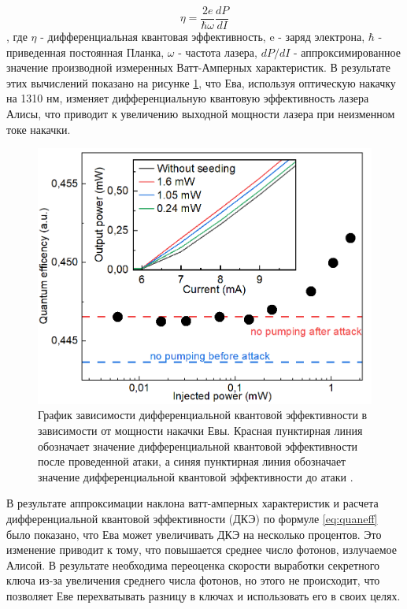 \begin{equation}
\eta = \frac{2e}{\hbar\omega}\frac{dP}{dI}
\label{eq:quaneff}
\end{equation}, 
где $\eta$ - дифференциальная квантовая эффективность, e - заряд электрона, $\hbar$ - приведенная постоянная Планка, $\omega$ - частота лазера, $dP/dI$ - аппроксимированное значение производной измеренных Ватт-Амперных характеристик.
В результате этих вычислений показано на рисунке \ref{fig:diff quant eff ch4}, что Ева, используя оптическую накачку на 1310 нм, изменяет дифференциальную квантовую эффективность лазера Алисы, что приводит к увеличению выходной мощности лазера при неизменном токе накачки.
\begin{figure}
    \centering
    \includegraphics{images/Эффективность 1310.png}
    \caption{График зависимости дифференциальной квантовой эффективности в зависимости от мощности накачки Евы. Красная пунктирная линия обозначает значение дифференциальной квантовой эффективности после проведенной атаки, а синяя пунктирная линия обозначает значение дифференциальной квантовой эффективности до атаки \cite{fadeev2025}.}
    \label{fig:diff quant eff ch4}
\end{figure}
В результате аппроксимации наклона ватт-амперных характеристик и расчета дифференциальной квантовой эффективности (ДКЭ) по формуле \ref{eq:quaneff} было показано, что Ева может увеличивать ДКЭ на несколько процентов. Это изменение приводит к тому, что повышается среднее число фотонов, излучаемое Алисой. В результате необходима переоценка скорости выработки секретного ключа из-за увеличения среднего числа фотонов, но этого не происходит, что позволяет Еве перехватывать разницу в ключах и использовать его в своих целях. 

